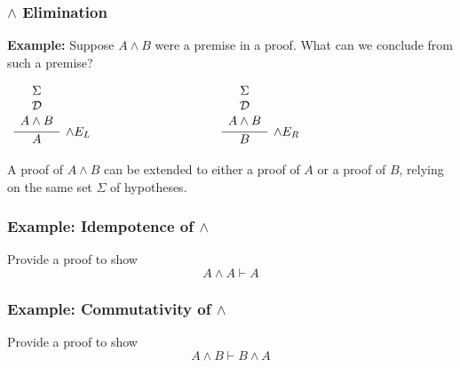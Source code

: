 \documentclass{beamer}
\begin{document}
\begin{frame}
	\frametitle{$\land$ Elimination}
	
	{\bf Example:} Suppose $A\land B$ were a premise in a proof. What can we conclude from such a premise?

	\begin{center}
		$\begin{array} { c c c }
		\infer[\land E_{L}]{A}
			{\begin{array}{c} \Sigma \\ \mathcal{D} \\ A \land B \end{array}}
		& \hspace{3cm} &
		\infer[\land E_{R}]{B}
			{\begin{array}{c} \Sigma \\ \mathcal{D} \\ A \land B \end{array}}
		\end{array}$
	\end{center}

	A proof of $A \land B$ can be extended to either a proof of $A$ or a proof of $B$, relying on the same set $\Sigma$ of hypotheses.
	
	\vspace{30mm}

\end{frame}

\begin{frame}
	\frametitle{Example: Idempotence of $\land$}
	
	Provide a proof to show $$A \land A \vdash A$$
	
	\vspace{60mm}
	
\end{frame}

\begin{frame}
	\frametitle{Example: Commutativity of $\land$}
	
	Provide a proof to show $$A \land B \vdash B \land A$$
		
	\vspace{60mm}
	
\end{frame}
\end{document}
